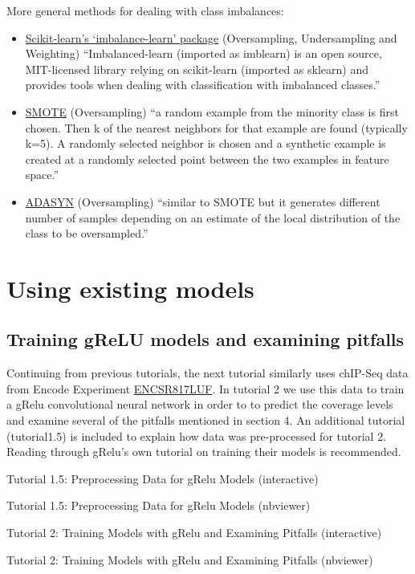 \documentclass[
]{book}
\begin{document}
More general methods for dealing with class imbalances:

\begin{itemize}
\item
  \href{https://imbalanced-learn.org/stable/user_guide.html\#user-guide}{Scikit-learn's `imbalance-learn' package} (Oversampling, Undersampling and Weighting)
  ``Imbalanced-learn (imported as imblearn) is an open source, MIT-licensed library relying on scikit-learn (imported as sklearn) and provides tools when dealing with classification with imbalanced classes.''
\item
  \href{https://machinelearningmastery.com/smote-oversampling-for-imbalanced-classification/}{SMOTE} (Oversampling)
  ``a random example from the minority class is first chosen. Then k of the nearest neighbors for that example are found (typically k=5). A randomly selected neighbor is chosen and a synthetic example is created at a randomly selected point between the two examples in feature space.''
\item
  \href{https://imbalanced-learn.org/stable/references/generated/imblearn.over_sampling.ADASYN.html}{ADASYN} (Oversampling)
  ``similar to SMOTE but it generates different number of samples depending on an estimate of the local distribution of the class to be oversampled.''
\end{itemize}

\part{Using existing models}\label{part-using-existing-models}

\chapter{Training gReLU models and examining pitfalls}\label{training-grelu-models-and-examining-pitfalls}

Continuing from previous tutorials, the next tutorial similarly uses chIP-Seq data from Encode Experiment \href{https://www.encodeproject.org/experiments/ENCSR817LUF/}{ENCSR817LUF}. In tutorial 2 we use this data to train a gRelu convolutional neural network in order to to predict the coverage levels and examine several of the pitfalls mentioned in section 4. An additional tutorial (tutorial1.5) is included to explain how data was pre-processed for tutorial 2. Reading through gRelu's own
tutorial on training their models is recommended.

Tutorial 1.5: Preprocessing Data for gRelu Models (interactive)

Tutorial 1.5: Preprocessing Data for gRelu Models (nbviewer)

Tutorial 2: Training Models with gRelu and Examining Pitfalls (interactive)

Tutorial 2: Training Models with gRelu and Examining Pitfalls (nbviewer)

  
\end{document}
